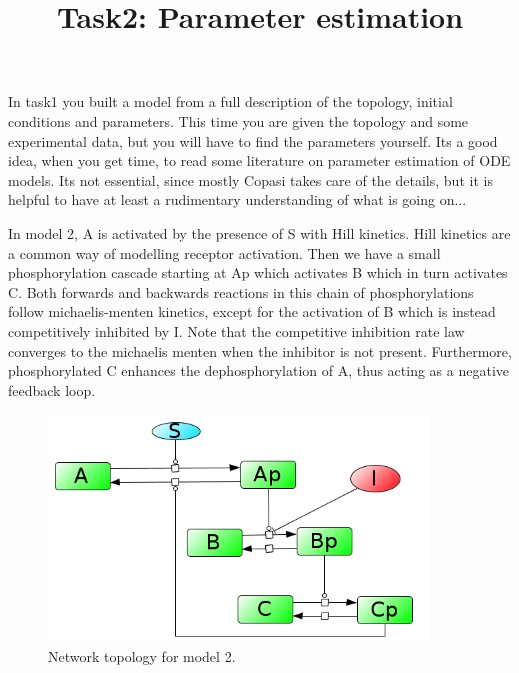 \documentclass[11pt]{article}
\title{Task2: Parameter estimation}
\begin{document}
\maketitle
    In task1 you built a model from a full description of the topology, initial conditions and parameters. This
    time you are given the topology and some experimental data, but you will have to find the parameters yourself. Its
    a good idea, when you get time, to read some literature on parameter estimation of ODE models. Its not essential,
    since mostly Copasi takes care of the details, but it is helpful to have at least a rudimentary understanding of
    what is going on...

    In model 2, A is activated by the presence of S with Hill kinetics. Hill kinetics are a common way of modelling
    receptor activation. Then we have a small phosphorylation cascade starting at Ap which activates B which in turn
    activates C. Both forwards and backwards reactions in this chain of phosphorylations follow michaelis-menten
    kinetics, except for the activation of B which is instead competitively inhibited by I. Note that the competitive
    inhibition rate law converges to the michaelis menten when the inhibitor is not present. Furthermore,
    phosphorylated C enhances the dephosphorylation of A, thus acting as a negative feedback loop.

    \begin{figure}[h]
        \centering
        \includegraphics[width=0.9\textwidth]{figures/Model2.png}
        \caption{Network topology for model 2. }
    \end{figure}
\end{document}

